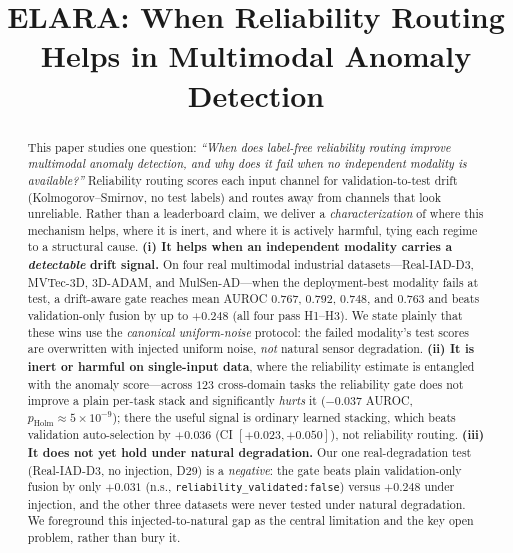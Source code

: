 \documentclass[10pt,conference]{IEEEtran}
\title{ELARA: When Reliability Routing Helps in Multimodal Anomaly Detection}
\author{\IEEEauthorblockN{Pratik Niroula}\IEEEauthorblockA{Independent Researcher}}
\begin{document}
\maketitle

\begin{abstract}
This paper studies one question: \emph{``When does label-free reliability routing
improve multimodal anomaly detection, and why does it fail when no independent
modality is available?''} Reliability routing scores each input channel for
validation-to-test drift (Kolmogorov--Smirnov, no test labels) and routes away from
channels that look unreliable. Rather than a leaderboard claim, we deliver a
\emph{characterization} of where this mechanism helps, where it is inert, and where
it is actively harmful, tying each regime to a structural cause.
\textbf{(i) It helps when an independent modality carries a \emph{detectable} drift
signal.} On four real multimodal industrial datasets---Real-IAD-D3, MVTec-3D,
3D-ADAM, and MulSen-AD---when the deployment-best modality fails at test, a
drift-aware gate reaches mean AUROC $0.767$, $0.792$, $0.748$, and $0.763$ and beats
validation-only fusion by up to $+0.248$ (all four pass H1--H3). We state plainly
that these wins use the \emph{canonical uniform-noise} protocol: the failed
modality's test scores are overwritten with injected uniform noise, \emph{not}
natural sensor degradation.
\textbf{(ii) It is inert or harmful on single-input data}, where the reliability
estimate is entangled with the anomaly score---across $123$ cross-domain tasks the
reliability gate does not improve a plain per-task stack and significantly
\emph{hurts} it ($-0.037$ AUROC, $p_{\mathrm{Holm}}\!\approx\!5\!\times\!10^{-9}$);
there the useful signal is ordinary learned stacking, which beats validation
auto-selection by $+0.036$ (CI $[+0.023,+0.050]$), not reliability routing.
\textbf{(iii) It does not yet hold under natural degradation.} Our one
real-degradation test (Real-IAD-D3, no injection, D29) is a \emph{negative}: the gate
beats plain validation-only fusion by only $+0.031$ (n.s.,
\texttt{reliability\_validated:false}) versus $+0.248$ under injection, and the other
three datasets were never tested under natural degradation. We foreground this
injected-to-natural gap as the central limitation and the key open problem, rather
than bury it.
\end{abstract}
\end{document}
